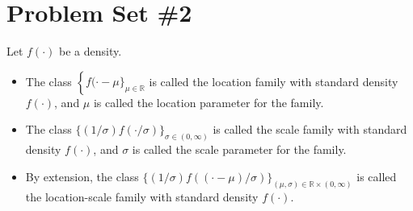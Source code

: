 \section{Problem Set \#2}

 Let \(f(\cdot)\) be a density. 
\begin{itemize}
    \item The class \(\left\{f(\cdot-\mu\}_{\mu \in \mathbb{R}}\right.\) is called the location family with standard density \(f(\cdot)\), and \(\mu\) is called the location parameter for the family. 
    \item The class \(\{(1 / \sigma) f(\cdot / \sigma)\}_{\sigma \in(0, \infty)}\) is called the scale family with standard density \(f(\cdot)\), and \(\sigma\) is called the scale parameter for the family. 
    \item By extension, the class \(\{(1 / \sigma) f((\cdot-\mu) / \sigma)\}_{(\mu, \sigma) \in \mathbb{R} \times(0, \infty)}\) is called the location-scale family with standard density \(f(\cdot)\).
\end{itemize}


